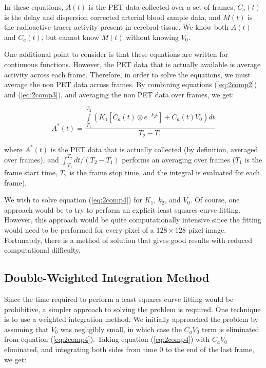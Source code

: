 \documentclass[12pt]{article}
\begin{document}
In these equations, $A(t)$ is the PET data collected over a set of
frames, $C_{a}(t)$ is the delay and dispersion corrected arterial
blood sample data, and $M(t)$ is the radioactive tracer activity
present in cerebral tissue.  We know both $A(t)$ and $C_{a}(t)$, but
cannot know $M(t)$ without knowing $V_{0}$.

One additional point to consider is that these equations are written
for continuous functions.  However, the PET data that is actually
available is average activity across each frame.  Therefore, in
order to solve the equations, we must average the non PET data
across frames.  By combining equations (\ref{eq:2comp2}) and
(\ref{eq:2comp3}), and averaging the non PET data over frames, we
get:

\begin{equation}
A^{*}(t) = \frac{\int\limits_{T_1}^{T_2} \left( K_{1} \left[ C_{a}(t) \otimes
  e^{-k_{2}t} \right] + C_{a}(t)V_{0} \right) dt}{T_{2} - T_{1}}
\label{eq:2comp4}
\end{equation}

where $A^{*}(t)$ is the PET data that is actually collected (by
definition, averaged over frames), and ${\int_{T_1}^{T_2}dt} / {(T_2 -
T_1)}$ performs an averaging over frames ($T_1$ is the frame start
time, $T_2$ is the frame stop time, and the integral is evaluated for
each frame).

We wish to solve equation (\ref{eq:2comp4}) for $K_{1}$, $k_{2}$, and
$V_{0}$.  Of course, one approach would be to try to perform an
explicit least squares curve fitting.  However, this approach would be
quite computationally intensive since the fitting would need to be
performed for every pixel of a $128 \times 128$ pixel image.  Fortunately,
there is a method of solution that gives good results with reduced
computational difficulty.

\subsection{Double-Weighted Integration Method}

\label{sec:double_weight}

Since the time required to perform a least squares curve fitting would
be prohibitive, a simpler approach to solving the problem is required.
One technique is to use a weighted integration method.  We initially
approached the problem by assuming that $V_{0}$ was negligibly small,
in which case the $C_{a}V_{0}$ term is eliminated from equation
(\ref{eq:2comp4}).  Taking equation (\ref{eq:2comp4}) with $C_{a}V_0$
eliminated, and integrating both sides from time 0 to the end of the
last frame, we get:
\end{document}
